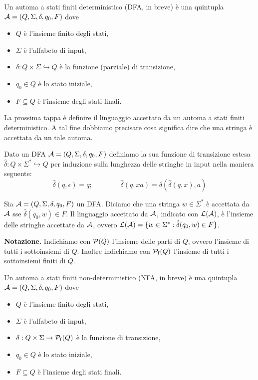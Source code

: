 \documentclass[runningheads,a4paper]{llncs}
\begin{document}
\begin{definition}[DFA]\label{def:DFA}
Un automa a stati finiti deterministico (DFA, in breve) \`{e} una quintupla $\mathcal{A} = (Q,\Sigma,\delta,q_0,F)$ dove 
\begin{itemize}
\item $Q$ \`{e} l'insieme finito degli stati,
\item $\Sigma$ \`{e} l'alfabeto di input,
\item $\delta: Q \times \Sigma \hookrightarrow Q$ \`{e} la funzione (parziale) di transizione,
\item $q_0 \in Q$ \`{e} lo stato iniziale,
\item $F \subseteq Q$ \`{e} l'insieme degli stati finali.
\end{itemize}
\end{definition}

La prossima tappa \`{e} definire il linguaggio accettato da un automa a stati finiti deterministico. A tal fine dobbiamo precisare cosa significa dire che una stringa \`{e} accettata da un tale automa.

\begin{definition}\label{def:trans-est}
Dato un DFA $\mathcal{A} = (Q,\Sigma,\delta,q_0,F)$ definiamo la sua funzione di transizione estesa $\hat{\delta}: Q \times \Sigma^* \hookrightarrow Q$ per induzione sulla lunghezza delle stringhe in input nella maniera seguente:
$$ \hat{\delta}(q,\epsilon) = q ; \qquad \qquad \hat{\delta}(q,xa) = \delta(\hat{\delta}(q,x),a) $$
\end{definition}

\begin{definition}\label{def:lang-acc}
Sia $\mathcal{A} = (Q,\Sigma,\delta,q_0,F)$ un DFA. Diciamo che una stringa $w \in \Sigma^*$ \`{e} accettata da $\mathcal{A}$ sse $\hat{\delta}(q_0,w) \in F$. Il linguaggio accettato da $\mathcal{A}$, indicato con $\mathcal{L}(\mathcal{A})$, \`{e} l'insieme delle stringhe accettate da $\mathcal{A}$, ovvero $\mathcal{L}(\mathcal{A}) = \{w \in \Sigma^* : \hat{\delta}(q_0,w) \in F\}$.
\end{definition}

\textbf{Notazione.} Indichiamo con $\mathcal{P}(Q)$ l'insieme delle parti di $Q$, ovvero l'insieme di tutti i sottoinsiemi di $Q$. Inoltre indichiamo con $\mathcal{P}_\mathrm{f}(Q)$ l'insieme di tutti i sottoinsiemi finiti di $Q$.

\begin{definition}[NFA]\label{def:NFA}
Un automa a stati finiti non-deterministico (NFA, in breve) \`{e} una quintupla $\mathcal{A} = (Q,\Sigma,\delta,q_0,F)$ dove 
\begin{itemize}
\item $Q$ \`{e} l'insieme finito degli stati,
\item $\Sigma$ \`{e} l'alfabeto di input,
\item $\delta: Q \times \Sigma \to \mathcal{P}_\mathrm{f}(Q)$ \`{e} la funzione di transizione,
\item $q_0 \in Q$ \`{e} lo stato iniziale,
\item $F \subseteq Q$ \`{e} l'insieme degli stati finali.
\end{itemize}
\end{definition}
\end{document}
